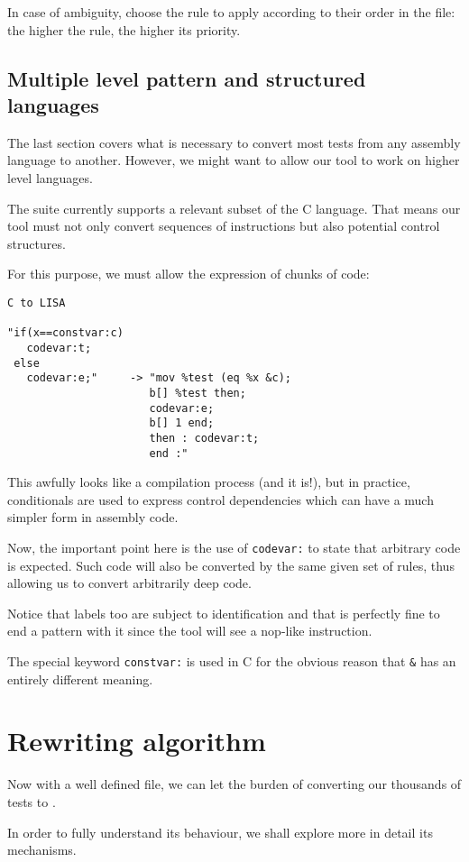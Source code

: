 In case of ambiguity, \jingle{} choose the rule to apply according to their order
in the file: the higher the rule, the higher its priority.

\subsection{Multiple level pattern and structured languages}
The last section covers what is necessary to convert most tests from any assembly language
to another. However, we might want to allow our tool to work on higher level languages.

The suite currently supports a relevant subset of the C language.
That means our tool must not only convert sequences of instructions but also
potential control structures.

For this purpose, we must allow the expression of chunks of code:

\begin{verbatim}
C to LISA

"if(x==constvar:c)
   codevar:t;
 else
   codevar:e;"     -> "mov %test (eq %x &c);
                      b[] %test then;
                      codevar:e;
                      b[] 1 end;
                      then : codevar:t;
                      end :"
\end{verbatim}

This awfully looks like a compilation process (and it is!), but in practice,
conditionals are used to express control dependencies which can have a much
simpler form in assembly code.

Now, the important point here is the use of \verb+codevar:+ to state that
arbitrary code is expected. Such code will also be converted by the same
given set of rules, thus allowing us to convert arbitrarily deep code.

Notice that labels too are subject to identification and that is
perfectly fine to end a pattern with it since the tool will see
a nop-like instruction.

The special keyword \verb+constvar:+ is used in C for the obvious reason
that \verb+&+ has an entirely different meaning.

\section{Rewriting algorithm}
Now with a well defined file, we can let the burden of converting our
thousands of tests to \jingle{}.

In order to fully understand its behaviour, we shall explore
more in detail its mechanisms.

